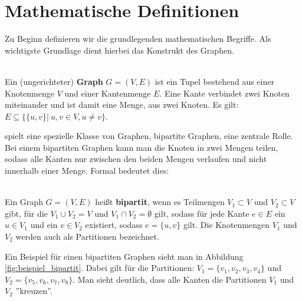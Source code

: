 



\section{Mathematische Definitionen}
Zu Beginn definieren wir die grundlegenden mathematischen Begriffe. Als wichtigste Grundlage dient 
hierbei das Konstrukt des  Graphen.
\begin{definition}[Graph] ~\\
Ein (ungerichteter) \textbf{Graph} $G = (V,E)$ ist ein Tupel bestehend aus einer Knotenmenge $V$ und einer Kantenmenge
 $E$. Eine Kante verbindet zwei Knoten miteinander und ist damit eine Menge, aus zwei Knoten.
 Es gilt: $E \subseteq \{ \{u,v\} |\ u,v \in V, u \neq v \}$.  
\end{definition}
 spielt eine spezielle Klasse von Graphen, bipartite Graphen, eine zentrale Rolle.
Bei einem bipartiten Graphen kann man die Knoten in zwei Mengen teilen, sodass alle Kanten nur zwischen den 
beiden Mengen verlaufen und nicht innerhalb einer Menge. Formal bedeutet dies:
\begin{definition} ~\\
Ein Graph $G=(V,E)$ heißt \textbf{bipartit}, wenn es Teilmengen $V_1 \subset V$ und $V_2 \subset V$ gibt, für die 
$V_1 \cup V_2 = V$ und $V_1 \cap V_2 = \emptyset$ gilt,
 sodass für jede Kante $e \in E$ ein $u \in V_1$ und ein $v \in V_2$ existiert, sodass $e = \{u,v\}$ gilt.
Die Knotenmengen $V_1$ und $V_2$ werden auch als Partitionen bezeichnet.
\end{definition}

\noindent
Ein Beispiel für einen bipartiten Graphen sieht man in Abbildung \ref{fig:beispiel_bipartit}. Dabei gilt für die Partitionen:
$V_1 = \{v_1,v_2,v_3,v_4\}$ und $V_2 = \{v_5,v_6,v_7,v_8\}$. Man sieht deutlich, dass alle Kanten die Partitionen
$V_1$ und $V_2$ ''kreuzen''.

